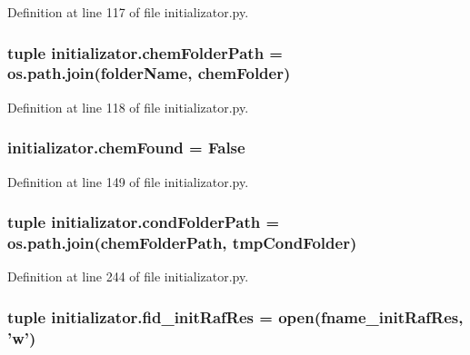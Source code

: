 Definition at line 117 of file initializator.\-py.

\hypertarget{a00104_a633d7089af5a033807ccba3b7e9ad483}{
\subsubsection[{chem\-Folder\-Path}]{\setlength{\rightskip}{0pt plus 5cm}tuple initializator.\-chem\-Folder\-Path = os.\-path.\-join({\bf folder\-Name}, {\bf chem\-Folder})}}\label{a00104_a633d7089af5a033807ccba3b7e9ad483}


Definition at line 118 of file initializator.\-py.

\hypertarget{a00104_acdd521d6bd1a71be37421dafd210de99}{
\subsubsection[{chem\-Found}]{\setlength{\rightskip}{0pt plus 5cm}initializator.\-chem\-Found = False}}\label{a00104_acdd521d6bd1a71be37421dafd210de99}


Definition at line 149 of file initializator.\-py.

\hypertarget{a00104_a7fe46587523066ae019cbe755f63888a}{
\subsubsection[{cond\-Folder\-Path}]{\setlength{\rightskip}{0pt plus 5cm}tuple initializator.\-cond\-Folder\-Path = os.\-path.\-join({\bf chem\-Folder\-Path}, {\bf tmp\-Cond\-Folder})}}\label{a00104_a7fe46587523066ae019cbe755f63888a}


Definition at line 244 of file initializator.\-py.

\hypertarget{a00104_a2f15742bdb2c2cebe65c8e9730915e28}{
\subsubsection[{fid\-\_\-init\-Raf\-Res}]{\setlength{\rightskip}{0pt plus 5cm}tuple initializator.\-fid\-\_\-init\-Raf\-Res = open({\bf fname\-\_\-init\-Raf\-Res}, 'w')}}\label{a00104_a2f15742bdb2c2cebe65c8e9730915e28}


